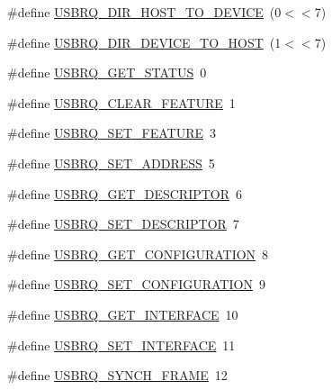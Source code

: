 \begin{DoxyCompactItemize}
\#define \hyperlink{mhvlib-_vusb-_keyboard_2vusb_2usbdrv_8h_aa187b3efe1a0ef577e6f695a47608bef}{U\-S\-B\-R\-Q\-\_\-\-D\-I\-R\-\_\-\-H\-O\-S\-T\-\_\-\-T\-O\-\_\-\-D\-E\-V\-I\-C\-E}~(0$<$$<$7)
\item 
\#define \hyperlink{mhvlib-_vusb-_keyboard_2vusb_2usbdrv_8h_a04a0c4970f7371115638586bc8a14325}{U\-S\-B\-R\-Q\-\_\-\-D\-I\-R\-\_\-\-D\-E\-V\-I\-C\-E\-\_\-\-T\-O\-\_\-\-H\-O\-S\-T}~(1$<$$<$7)
\item 
\#define \hyperlink{mhvlib-_vusb-_keyboard_2vusb_2usbdrv_8h_a523252bd739d1b14018ec34e49466d72}{U\-S\-B\-R\-Q\-\_\-\-G\-E\-T\-\_\-\-S\-T\-A\-T\-U\-S}~0
\item 
\#define \hyperlink{mhvlib-_vusb-_keyboard_2vusb_2usbdrv_8h_a82766d6fb4294e1cb5f7cb2086e81715}{U\-S\-B\-R\-Q\-\_\-\-C\-L\-E\-A\-R\-\_\-\-F\-E\-A\-T\-U\-R\-E}~1
\item 
\#define \hyperlink{mhvlib-_vusb-_keyboard_2vusb_2usbdrv_8h_a1802461b0f91708022a66f407fadd1f1}{U\-S\-B\-R\-Q\-\_\-\-S\-E\-T\-\_\-\-F\-E\-A\-T\-U\-R\-E}~3
\item 
\#define \hyperlink{mhvlib-_vusb-_keyboard_2vusb_2usbdrv_8h_a6837bf1e17c56a25b97db0be68b03519}{U\-S\-B\-R\-Q\-\_\-\-S\-E\-T\-\_\-\-A\-D\-D\-R\-E\-S\-S}~5
\item 
\#define \hyperlink{mhvlib-_vusb-_keyboard_2vusb_2usbdrv_8h_a225b041572762941a96694d5498e853e}{U\-S\-B\-R\-Q\-\_\-\-G\-E\-T\-\_\-\-D\-E\-S\-C\-R\-I\-P\-T\-O\-R}~6
\item 
\#define \hyperlink{mhvlib-_vusb-_keyboard_2vusb_2usbdrv_8h_a2fb2a12d1a7d37bce6bcf535f48ade9e}{U\-S\-B\-R\-Q\-\_\-\-S\-E\-T\-\_\-\-D\-E\-S\-C\-R\-I\-P\-T\-O\-R}~7
\item 
\#define \hyperlink{mhvlib-_vusb-_keyboard_2vusb_2usbdrv_8h_a16d2228bcfa8944c18a39df43016cea5}{U\-S\-B\-R\-Q\-\_\-\-G\-E\-T\-\_\-\-C\-O\-N\-F\-I\-G\-U\-R\-A\-T\-I\-O\-N}~8
\item 
\#define \hyperlink{mhvlib-_vusb-_keyboard_2vusb_2usbdrv_8h_afc6adbbfd47da950ccf50277a41bfe58}{U\-S\-B\-R\-Q\-\_\-\-S\-E\-T\-\_\-\-C\-O\-N\-F\-I\-G\-U\-R\-A\-T\-I\-O\-N}~9
\item 
\#define \hyperlink{mhvlib-_vusb-_keyboard_2vusb_2usbdrv_8h_a44a94b5f45d9ffb957b9590eea8a73a4}{U\-S\-B\-R\-Q\-\_\-\-G\-E\-T\-\_\-\-I\-N\-T\-E\-R\-F\-A\-C\-E}~10
\item 
\#define \hyperlink{mhvlib-_vusb-_keyboard_2vusb_2usbdrv_8h_a904cc1bbdd859501d590ce47099a49ec}{U\-S\-B\-R\-Q\-\_\-\-S\-E\-T\-\_\-\-I\-N\-T\-E\-R\-F\-A\-C\-E}~11
\item 
\#define \hyperlink{mhvlib-_vusb-_keyboard_2vusb_2usbdrv_8h_ac4b47c9502650f6a74714f852825746c}{U\-S\-B\-R\-Q\-\_\-\-S\-Y\-N\-C\-H\-\_\-\-F\-R\-A\-M\-E}~12

\end{DoxyCompactItemize}
